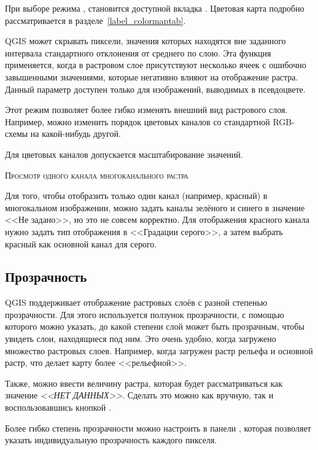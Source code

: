При выборе режима , становится
доступной вкладка . Цветовая карта подробно
рассматривается в разделе~\ref{label_colormaptab}.

QGIS может скрывать пиксели, значения которых находятся вне заданного
интервала стандартного отклонения от среднего по слою.
Эта функция применяется, когда в растровом слое присутствуют несколько ячеек
с ошибочно завышенными значениями, которые негативно влияют на отображение растра.
Данный параметр доступен только для изображений, выводимых в псевдоцвете.


Этот режим позволяет более гибко изменять внешний вид растрового слоя.
Например, можно изменить порядок цветовых каналов со стандартной RGB-схемы на
какой-нибудь другой.

Для цветовых каналов допускается масштабирование значений.

\begin{Tip}\caption{\textsc{Просмотр одного канала многоканального растра}}
Для того, чтобы отобразить только один канал (например, красный) в
многокальном изображении, можно задать каналы зелёного и синего в значение
<<Не задано>>, но это не совсем корректно. Для отображения красного
канала нужно задать тип отображения в <<Градации серого>>, а затем
выбрать красный как основной канал для серого.
\end{Tip}

\subsection{Прозрачность} \label{rastertab:transparency}

QGIS поддерживает отображение растровых слоёв с разной степенью
прозрачности. Для этого используется
ползунок прозрачности, с помощью которого можно указать, до какой
степени слой может быть прозрачным, чтобы увидеть слои, находящиеся под
ним. Это очень удобно, когда загружено множество растровых слоев.
Например, когда загружен растр рельефа и основной растр, что делает
карту более <<рельефной>>.

Также, можно ввести величину растра, которая будет рассматриваться
как значение {\em <<НЕТ ДАННЫХ>>}. Сделать это можно как вручную, так и
воспользовавшись кнопкой
.

Более гибко степень прозрачности можно настроить в панели
, которая позволяет указать индивидуальную
прозрачность каждого пикселя.

